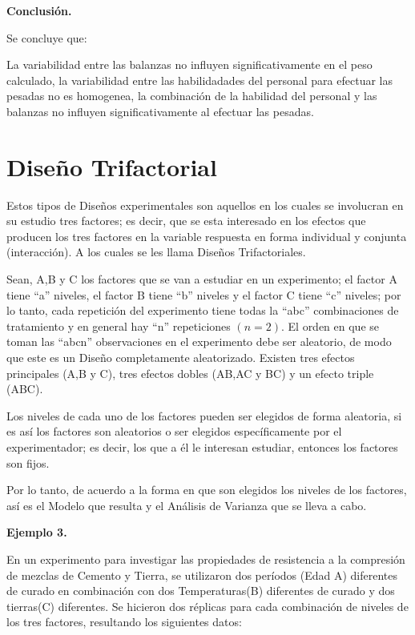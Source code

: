 \documentclass[12pt,letterpaper]{report}
\begin{document}
\textbf{Conclusión.}

Se concluye que:

La variabilidad entre las balanzas no influyen significativamente en el peso calculado, la variabilidad entre las habilidadades del personal para efectuar las pesadas no es homogenea, la combinación de la habilidad del personal y las balanzas no influyen significativamente al efectuar las pesadas.


\section*{Diseño Trifactorial}
Estos tipos de Diseños experimentales son aquellos en los cuales se involucran en su
estudio tres factores; es decir, que se esta interesado en los efectos que producen los tres
factores en la variable respuesta en forma individual y conjunta (interacción). A los cuales se
les llama Diseños Trifactoriales.

Sean, A,B y C los factores que se van a estudiar en un experimento; el factor A tiene
“a” niveles, el factor B tiene “b” niveles y el factor C tiene “c” niveles; por lo tanto, cada
repetición del experimento tiene todas la “abc” combinaciones de tratamiento y en general hay
“n” repeticiones $(n = 2)$. El orden en que se toman las “abcn” observaciones en el experimento
debe ser aleatorio, de modo que este es un Diseño completamente aleatorizado.
Existen tres efectos principales (A,B y C), tres efectos dobles (AB,AC y BC) y un efecto
triple (ABC).

Los niveles de cada uno de los factores pueden ser elegidos de forma aleatoria, si es así
los factores son aleatorios o ser elegidos específicamente por el experimentador; es decir, los
que a él le interesan estudiar, entonces los factores son fijos.

Por lo tanto, de acuerdo a la forma en que son elegidos los niveles de los factores, así es
el Modelo que resulta y el Análisis de Varianza que se lleva a cabo.

\textbf{Ejemplo 3.}

En un experimento para investigar las propiedades de resistencia a la compresión de
mezclas de Cemento y Tierra, se utilizaron dos períodos (Edad A) diferentes de curado en
combinación con dos Temperaturas(B) diferentes de curado y dos tierras(C) diferentes. Se
hicieron dos réplicas para cada combinación de niveles de los tres factores, resultando los
siguientes datos:
\end{document}

